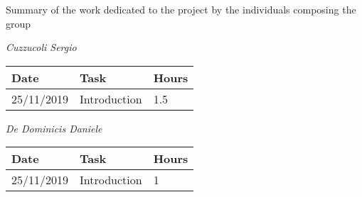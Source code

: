 Summary of the work dedicated to the project by the individuals composing the group

\vspace{1cm}

\textit{Cuzzucoli Sergio}

\hfill

\begin{tabular}{|l|l|l|}

\hline

\textbf{Date} & \textbf{Task} & \textbf{Hours} \\ \hline
25/11/2019 & Introduction &  1.5 \\ \hline

\end{tabular}

\vspace{1cm}

\textit{De Dominicis Daniele}

\hfill

\begin{tabular}{|l|l|l|}

\hline

\textbf{Date} & \textbf{Task} & \textbf{Hours} \\ \hline
25/11/2019 & Introduction &  1 \\ \hline

\end{tabular}